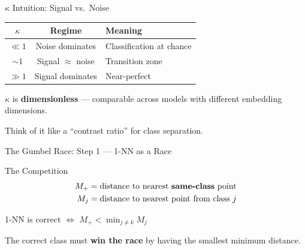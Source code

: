 \documentclass[aspectratio=169,14pt]{beamer}
\begin{document}
\begin{frame}{$\kappa$ Intuition: Signal vs.\ Noise}
\begin{center}
\begin{tabular}{ccl}
\toprule
$\kappa$ & Regime & Meaning \\
\midrule
$\ll 1$ & Noise dominates & Classification at chance \\
$\sim 1$ & Signal $\approx$ noise & Transition zone \\
$\gg 1$ & Signal dominates & Near-perfect \\
\bottomrule
\end{tabular}
\end{center}

\vspace{0.5cm}
$\kappa$ is \textbf{dimensionless} --- comparable across models with different embedding dimensions.

\vspace{0.3cm}
Think of it like a ``contrast ratio'' for class separation.
\end{frame}

\begin{frame}{The Gumbel Race: Step 1 --- 1-NN as a Race}
\begin{block}{The Competition}
\begin{align*}
M_+ &= \text{distance to nearest \textbf{same-class} point} \\
M_j &= \text{distance to nearest point from class } j
\end{align*}
\end{block}

\vspace{0.3cm}
\begin{center}
\Large
1-NN is correct $\iff$ $M_+ < \min_{j \neq k} M_j$
\end{center}

\vspace{0.3cm}
The correct class must \textbf{win the race} by having the smallest minimum distance.
\end{frame}
\end{document}
